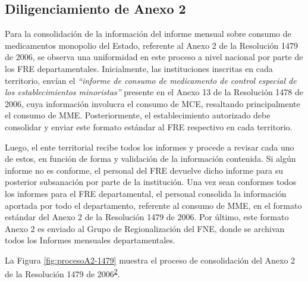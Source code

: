 \documentclass[
]{book}
\begin{document}
\hypertarget{diligenciamiento-de-anexo-2}{%
\subsection{Diligenciamiento de Anexo 2}\label{diligenciamiento-de-anexo-2}}

Para la consolidación de la información del informe mensual sobre consumo de medicamentos monopolio del Estado, referente al Anexo 2 de la Resolución 1479 de 2006, se observa una uniformidad en este proceso a nivel nacional por parte de los FRE departamentales. Inicialmente, las instituciones inscritas en cada territorio, envían el \emph{``informe de consumo de medicamento de control especial de los establecimientos minoristas''} presente en el Anexo 13 de la Resolución 1478 de 2006, cuya información involucra el consumo de MCE, resaltando principalmente el consumo de MME. Posteriormente, el establecimiento autorizado debe consolidar y enviar este formato estándar al FRE respectivo en cada territorio.

Luego, el ente territorial recibe todos los informes y procede a revisar cada uno de estos, en función de forma y validación de la información contenida. Si algún informe no es conforme, el personal del FRE devuelve dicho informe para su posterior subsanación por parte de la institución. Una vez sean conformes todos los informes para el FRE departamental, el personal consolida la información aportada por todo el departamento, referente al consumo de MME, en el formato estándar del Anexo 2 de la Resolución 1479 de 2006. Por último, este formato Anexo 2 es enviado al Grupo de Regionalización del FNE, donde se archivan todos los Informes mensuales departamentales.

La Figura \ref{fig:procesoA2-1479} muestra el proceso de consolidación del Anexo 2 de la Resolución 1479 de 2006\textsuperscript{\protect\hyperlink{ref-MSPS1479-2006}{2}}.
\end{document}
